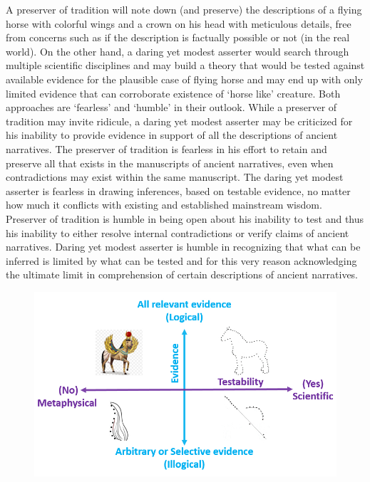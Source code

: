 A preserver of tradition will note down (and preserve) the descriptions of a flying horse with colorful wings and a crown on his head with meticulous details, free from concerns such as if the description is factually possible or not (in the real world). On the other hand, a daring yet modest asserter would search through multiple scientific disciplines and may build a theory that would be tested against available evidence for the plausible case of flying horse and may end up with only limited evidence that can corroborate existence of ‘horse like’ creature. Both approaches are ‘fearless’ and ‘humble’ in their outlook. While a preserver of tradition may invite ridicule, a daring yet modest asserter may be criticized for his inability to provide evidence in support of all the descriptions of ancient narratives. The preserver of tradition is fearless in his effort to retain and preserve all that exists in the manuscripts of ancient narratives, even when contradictions may exist within the same manuscript. The daring yet modest asserter is fearless in drawing inferences, based on testable evidence, no matter how much it conflicts with existing and established mainstream wisdom. Preserver of tradition is humble in being open about his inability to test and thus his inability to either resolve internal contradictions or verify claims of ancient narratives. Daring yet modest asserter is humble in recognizing that what can be inferred is limited by what can be tested and for this very reason acknowledging the ultimate limit in comprehension of certain descriptions of ancient narratives.

\setcounter{figure}{1}

\begin{figure}[!h]
\includegraphics[scale=.3]{images/chap2-3.jpg}
\caption{}\label{chap1-fig2}
\end{figure}

